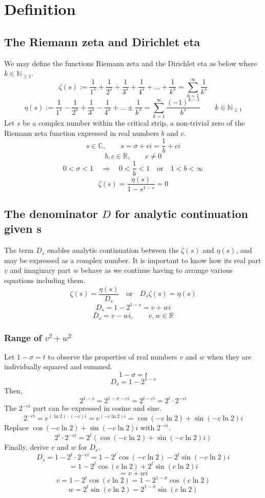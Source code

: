 \documentclass{amsart}
\begin{document}
	\section{Definition}
	\subsection{The Riemann zeta and Dirichlet eta}
	We may define the functions Riemann zeta \cite{uberdie_riemann}\cite{Bombieri2000ProblemsOT} and the Dirichlet eta as below where $ k \in \mathbb{N}_{\geq 1} $.
	\[ \zeta(s) := \frac{1}{1^s} + \frac{1}{2^s} + \frac{1}{3^s} + \frac{1}{4^s} + {\dots} + \frac{1}{k^s} = \sum\limits_{k=1}^{\infty}\frac{1}{k^s} \]
	\[ \eta(s) := \frac{1}{1^s} - \frac{1}{2^s} + \frac{1}{3^s} - \frac{1}{4^s} + ... \pm \frac{1}{k^s} = \sum\limits_{k=1}^{\infty}\frac{(-1)^{k-1}}{k^s} \qquad k \in \mathbb{N}_{\geq 1} \]
	Let $s$ be a complex number within the critical strip, a non-trivial zero of the Riemann zeta function expressed in real numbers $b$ and $c$.
	\[ s \in \mathbb{C}, \qquad s = \sigma + ci = \frac{1}{b} + ci \]
	\[ b,c \in \mathbb{R}, \qquad c \neq 0 \]
	\[ 0 < \sigma < 1 \quad \Rightarrow \quad 0 < \frac{1}{b} < 1 \quad \text{or} \quad 1<b<\infty \]
	\[ \zeta(s) = \frac{\eta(s)}{1-s^{1-s}} = 0 \]
	\[\]	
	
	\subsection{The denominator $D$ for analytic continuation given s}
	The term $D_s$ enables analytic continuation between the $\zeta(s)$ and $\eta(s)$, and may be expressed as a complex number. It is important to know how its real part $v$ and imaginary part $w$ behave as we continue having to arrange various equations including them.
	\[ \zeta(s) = \frac{\eta(s)}{D_s} \quad \text{or} \quad D_s\zeta(s) = \eta(s) \]
	\[ D_{s} = 1-2^{1-s} = v + wi \]
	\[ \bar{D}_{s} = v - wi,  \qquad v,w \in \mathbb{R} \]
	\[\]
	
	\subsubsection{Range of $v^2+w^2$}
	Let $1 - \sigma = t$ to observe the properties of real numbers $v$ and $w$ when they are individually squared and summed.
	\[ 1 - \sigma = t \]
	\[ D_{s} = 1-2^{1-s} \]
	Then, 
	\[ 2^{1-s} = 2^{1-\sigma - ci} = 2^{t-ci} = 2^t \cdot 2^{-ci} \]
	The $2^{-ci}$ part can be expressed in cosine and sine.
	\[ 2^{-ci} = e^{(\ln2) \cdot (-c)i} = e^{(-c \ln 2) i} = \cos(-c \ln 2) + \sin(-c \ln 2)i \]
	Replace $\cos(-c \ln 2) + \sin(-c \ln 2)i$ with $2^{-ci}$.
	\[ 2^t \cdot 2^{-ci} = 2^t(\cos(-c \ln 2) + \sin(-c \ln 2)i) \]
	Finally, derive $v$ and $w$ for $D_s$.
	\[ D_{s} = 1-2^t \cdot 2^{-ci} = 1 - 2^t\cos(-c \ln 2) - 2^t\sin(-c \ln 2)i \]
	\[ = 1 - 2^t\cos(c \ln 2) + 2^t\sin(c \ln 2)i \]
	\[ = v + wi \]
	\[ v = 1 - 2^t\cos(c \ln 2) = 1 - 2^{1-\sigma}\cos(c \ln 2) \]
	\[ w = 2^t\sin(c \ln 2) = 2^{1-\sigma}\sin(c \ln 2) \]
	\[\]
	
\end{document}
